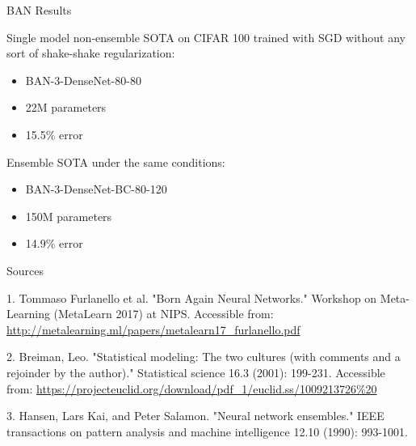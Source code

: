 \documentclass{beamer}
\begin{document}
\begin{frame}{BAN Results}

Single model non-ensemble SOTA on CIFAR 100 trained with SGD without any sort
of shake-shake regularization:
\begin{itemize}
\item BAN-3-DenseNet-80-80
\item 22M parameters
\item 15.5\% error 
\end{itemize}

\vfill

Ensemble SOTA under the same conditions:
\begin{itemize}
\item BAN-3-DenseNet-BC-80-120
\item 150M parameters
\item 14.9\% error 
\end{itemize}
\end{frame}

\begin{frame}{Sources}

\begin{thebibliography}{0}

   1. Tommaso Furlanello et al. "Born Again Neural Networks." Workshop on Meta-Learning (MetaLearn 2017) at NIPS. Accessible from: \url{http://metalearning.ml/papers/metalearn17_furlanello.pdf}
  
   2. Breiman, Leo. "Statistical modeling: The two cultures (with comments and a rejoinder by the author)." Statistical science 16.3 (2001): 199-231. Accessible from: \url{https://projecteuclid.org/download/pdf_1/euclid.ss/1009213726\%20}
  
   3. Hansen, Lars Kai, and Peter Salamon. "Neural network ensembles." IEEE transactions on pattern analysis and machine intelligence 12.10 (1990): 993-1001.
\end{thebibliography}

\end{frame}
\end{document}
